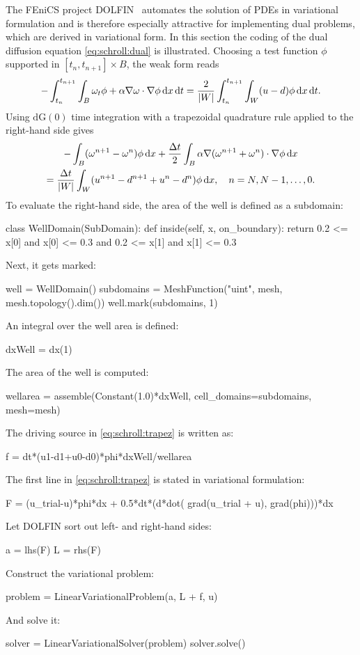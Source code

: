 The FEniCS project DOLFIN~\citep{LoggWells2010} automates the solution
of PDEs in variational formulation and is therefore especially
attractive for implementing dual problems, which are derived in
variational form.  In this section the coding of the dual diffusion
equation
\eqref{eq:schroll:dual} is illustrated.
Choosing a test function $\phi$ supported in $[t_n, t_{n+1}] \times B$,
the weak form reads
\begin{equation}
 - \int_{t_n}^{t_{n+1}} \int_B \omega_t \phi + \alpha \nabla \omega \cdot \nabla \phi \, \mathrm{d}x \, \mathrm{d}t =
 \frac{2}{|W|} \int_{t_n}^{t_{n+1}} \int_W (u-d) \phi \, \mathrm{d}x \, \mathrm{d}t.
\end{equation}
Using $\mathrm{dG}(0)$ time integration with a trapezoidal quadrature rule applied to the right-hand side gives
\begin{multline} \label{eq:schroll:trapez}
 - \int_B (\omega^{n+1}-\omega^n) \phi \, \mathrm{d}x
     + \frac{\Delta t}{2} \int_B \alpha \nabla(\omega^{n+1}+\omega^n) \cdot \nabla \phi \, \mathrm{d}x
\\
 = \frac{\Delta t}{|W|} \int_W (u^{n+1} - d^{n+1} +u^n -d^n) \phi \, \mathrm{d}x,
 \quad n = N, N-1,\ldots, 0 .
\end{multline}
To evaluate the right-hand side, the area of the well is defined as a subdomain:
\begin{python}
class WellDomain(SubDomain):
    def inside(self, x, on_boundary):
        return 0.2 <= x[0] and x[0] <= 0.3 and 0.2 <= x[1] and x[1] <= 0.3
\end{python}
Next, it gets marked:
\begin{python}
well = WellDomain()
subdomains = MeshFunction("uint", mesh, mesh.topology().dim())
well.mark(subdomains, 1)
\end{python}
An integral over the well area is defined:
\begin{python}
dxWell = dx(1)
\end{python}
The area of the well is computed:
\begin{python}
wellarea = assemble(Constant(1.0)*dxWell, cell_domains=subdomains, mesh=mesh)
\end{python}
The driving source in \eqref{eq:schroll:trapez} is written as:
\begin{python}
f = dt*(u1-d1+u0-d0)*phi*dxWell/wellarea
\end{python}
The first line in \eqref{eq:schroll:trapez} is stated in variational formulation:
\begin{python}
F = (u_trial-u)*phi*dx + 0.5*dt*(d*dot( grad(u_trial + u), grad(phi)))*dx
\end{python}
Let DOLFIN sort out left- and right-hand sides:
\begin{python}
a = lhs(F)
L = rhs(F)
\end{python}
Construct the variational problem:
\begin{python}
problem = LinearVariationalProblem(a, L + f, u)
\end{python}
And solve it:
\begin{python}
solver = LinearVariationalSolver(problem)
solver.solve()
\end{python}

